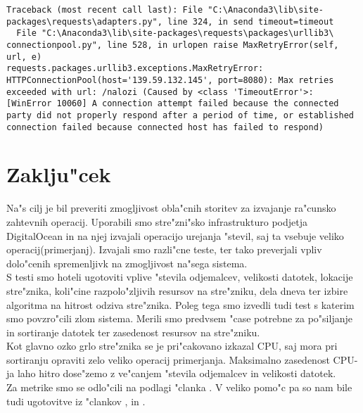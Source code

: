 \begin{itemize}
	\begin{lstlisting}
Traceback (most recent call last): File "C:\Anaconda3\lib\site-packages\requests\adapters.py", line 324, in send timeout=timeout
  File "C:\Anaconda3\lib\site-packages\requests\packages\urllib3\ connectionpool.py", line 528, in urlopen raise MaxRetryError(self, url, e)
requests.packages.urllib3.exceptions.MaxRetryError: HTTPConnectionPool(host='139.59.132.145', port=8080): Max retries exceeded with url: /nalozi (Caused by <class 'TimeoutError'>: [WinError 10060] A connection attempt failed because the connected party did not properly respond after a period of time, or established connection failed because connected host has failed to respond)
	\end{lstlisting}

    \end{itemize}


\section{Zaklju"cek}

Na"s cilj je bil preveriti zmogljivost obla"cnih storitev za izvajanje ra"cunsko zahtevnih operacij. Uporabili smo stre"zni"sko infrastrukturo podjetja DigitalOcean in na njej izvajali operacijo urejanja "stevil, saj ta vsebuje veliko operacij(primerjanj).
Izvajali smo razli"cne teste, ter tako preverjali vpliv dolo"cenih spremenljivk na zmogljivost na"sega sistema. \\
S testi smo hoteli ugotoviti vplive "stevila odjemalcev, velikosti datotek, lokacije stre"znika, koli"cine razpolo"zljivih resursov na stre"zniku, dela dneva ter izbire algoritma na hitrost odziva stre"znika. Poleg tega smo izvedli tudi test s katerim smo povzro"cili zlom sistema.
Merili smo predvsem "case potrebne za po"siljanje in sortiranje datotek ter zasedenost resursov na stre"zniku.\\
Kot glavno ozko grlo stre"znika se je pri"cakovano izkazal CPU, saj mora pri sortiranju opraviti zelo veliko operacij primerjanja. Maksimalno zasedenost CPU-ja laho hitro dose"zemo z ve"canjem "stevila odjemalcev in velikosti datotek.\\
Za metrike smo se odlo"cili na podlagi "clanka \cite{8_ibm_metrics}. V veliko pomo"c pa so nam bile tudi ugotovitve iz "clankov \cite{8_performance_challenges}, \cite{8_performance_analysis} in \cite{8_performance_evaluation}.

